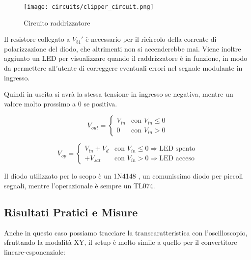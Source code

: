 \begin{figure}[H]
    \centering
    \texttt{[image: circuits/clipper\_circuit.png]}
    \caption{Circuito raddrizzatore}
    \label{clipper_circuit}
\end{figure}

Il resistore collegato a $V_{b1}'$ è necessario per il ricircolo della corrente di
polarizzazione del diodo, che altrimenti non si accenderebbe mai. Viene inoltre aggiunto un
LED per visualizzare quando il raddrizzatore è in funzione, in modo da permettere all'utente
di correggere eventuali errori nel segnale modulante in ingresso.

Quindi in uscita si avrà la stessa tensione in ingresso se negativa, mentre un valore molto
prossimo a $0$ se positiva.

\begin{equation}\label{clipper_out}
    V_{out} =
    \left\{
    \begin{array}{lr}
        V_{in} & \text{con } V_{in}\le0 \\
        0      & \text{con } V_{in}>0
    \end{array}
    \right.
\end{equation}

\begin{equation}\label{clipper_op}
    V_{op} =
    \left\{
    \begin{array}{lr}
        V_{in}+V_d & \text{con } V_{in}\le0\Rightarrow \text{LED spento} \\
        +V_{sat}   & \text{con } V_{in}>0\Rightarrow \text{LED acceso}
    \end{array}
    \right.
\end{equation}

Il diodo utilizzato per lo scopo è un 1N4148 \cite{1n4148}, un comunissimo diodo per piccoli
segnali, mentre l'operazionale è sempre un TL074.


\subsection*{Risultati Pratici e Misure}


Anche in questo caso possiamo tracciare la transcaratteristica con l'oscilloscopio, sfruttando
la modalità XY, il setup è molto simile a quello per il convertitore lineare-esponenziale:


